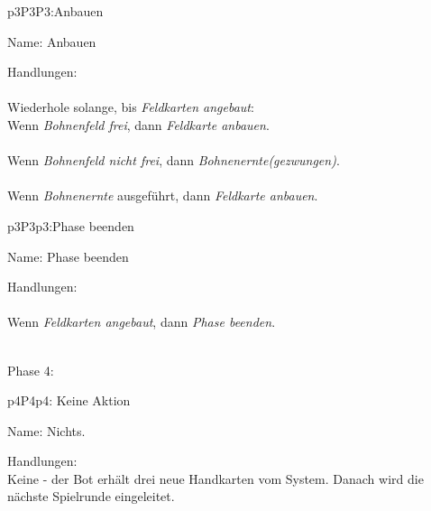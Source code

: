 \begin{description}[leftmargin=5em, style=sameline]
	
	\begin{lhp}{p3}{P3}{P3:Anbauen}
		\item [Name:] Anbauen
		\item [Handlungen:]\hfill\\ 
		\\Wiederhole solange, bis {\itshape Feldkarten angebaut}:
		\\Wenn {\itshape Bohnenfeld frei}, dann 
		{\itshape Feldkarte anbauen}.\\	
		\\Wenn {\itshape Bohnenfeld nicht frei}, dann 
		{\itshape Bohnenernte(gezwungen)}.\\
		\\Wenn {\itshape Bohnenernte} ausgeführt, dann 
		{\itshape Feldkarte anbauen}.\\
	\end{lhp}
	
	\begin{lhp}{p3}{P3}{p3:Phase beenden}
		\item [Name:] Phase beenden
		\item [Handlungen:]\hfill\\ 
		\\Wenn {\itshape Feldkarten angebaut}, dann 
		{\itshape Phase beenden}.\\
	\end{lhp}
	
\end{description}


\hfill\\ Phase 4:\\


\begin{description}[leftmargin=5em, style=sameline]
	
	\begin{lhp}{p4}{P4}{p4: Keine Aktion}
		\item [Name:] Nichts.
		\item [Handlungen:]\hfill\\ 
		Keine - der Bot erhält drei neue Handkarten vom System. Danach wird die nächste Spielrunde eingeleitet. 
	\end{lhp}
	
\end{description}